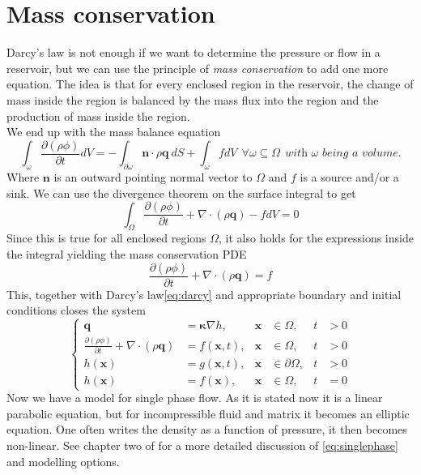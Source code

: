 \documentclass[../Main/main.tex]{subfiles}
\begin{document}
\section*{Mass conservation}
Darcy's law is not enough if we want to determine the pressure or flow in a reservoir, but we can use the principle of \emph{mass conservation} to add one more equation. 
The idea is that for every enclosed region in the reservoir, the change of mass inside the region is balanced by the mass flux into the region and the production of mass inside the region.
\\
We end up with the mass balance equation
\begin{equation*}
\int_{\omega}\frac{\partial (\rho \phi) }{\partial t} dV= -\int_{\partial\omega}\pmb{n}\cdot\rho\pmb{q} \ dS+\int_{\omega} f dV \ \ \forall \omega \subseteq \Omega \ \ \textit{with }\omega \textit{ being a volume.}
\end{equation*}
Where $\pmb{n}$ is an outward pointing normal vector to $\Omega$ and $f$ is a source and/or a sink. We can use the divergence theorem on the surface integral to get
\begin{equation*}
\int_{\Omega}\frac{\partial (\rho \phi) }{\partial t} + \nabla \cdot(\rho \pmb{q}) -fdV= 0
\end{equation*}
Since this is true for all enclosed regions $\Omega$, it also holds for the expressions inside the integral yielding the mass conservation PDE
\begin{equation*}
\frac{\partial (\rho \phi) }{\partial t} + \nabla \cdot (\rho \pmb{q}) = f
\end{equation*}
This, together with Darcy's law\eqref{eq:darcy} and appropriate boundary and initial conditions closes the system
\begin{equation}\label{eq:singlephase}
\left \{ \begin{aligned}
	\pmb{q} &=\pmb{\kappa} \nabla h, & \pmb{x} &\in \Omega,  &t &>0 \\
	\frac{\partial (\rho \phi) }{\partial t} + \nabla \cdot(\rho \pmb{q}) &=f(\pmb{x},t), & \pmb{x} &\in \Omega, & t &>0 \\
	h(\pmb{x}) &= g(\pmb{x},t), &\pmb{x} &\in \partial \Omega,&t &>0 \\
	h(\pmb{x}) &= f(\pmb{x}), & 	\pmb{x} &\in \Omega,  &	t &=0 
\end{aligned}\right. 
\end{equation}
Now we have a model for single phase flow. As it is stated now it is a linear parabolic equation, but for incompressible fluid and matrix it becomes an elliptic equation. One often writes the density as a function of pressure, it then becomes non-linear. See chapter two of \cite{Nordbotten} for a more detailed discussion of \eqref{eq:singlephase} and modelling options.
\end{document}
